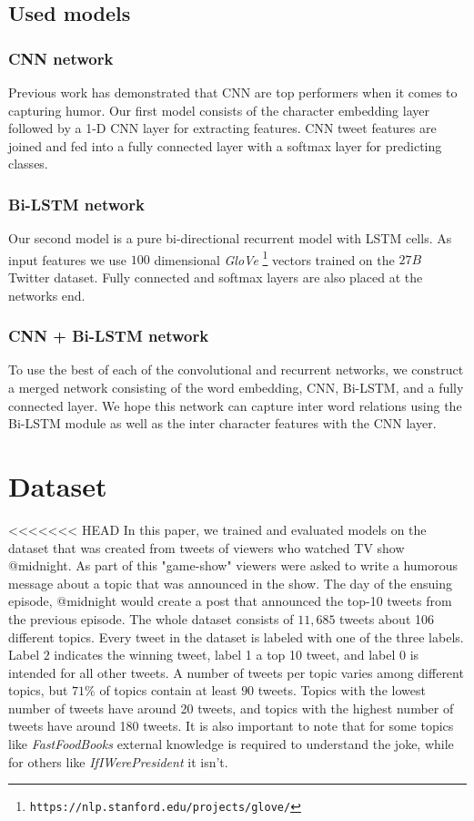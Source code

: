 \documentclass[10pt, a4paper]{article}
\begin{document}
\subsection{Used models}

\subsubsection{CNN network}
Previous work \citep{onaj_rad_s_cnn} has demonstrated that CNN are top performers
when it comes to capturing humor. Our first model consists of the character
embedding layer followed by a 1-D CNN layer for extracting features. CNN tweet
features are joined and fed into a fully connected layer with a softmax layer
for predicting classes. 

\subsubsection{Bi-LSTM network}
Our second model is a pure bi-directional recurrent model with LSTM cells. As
input features we use $100$ dimensional \emph{GloVe} \footnote{\texttt{https://nlp.stanford.edu/projects/glove/}} \citep{glove2014} vectors trained on the $27B$
Twitter dataset. Fully connected and softmax layers are also placed at the
networks end.

\subsubsection{CNN + Bi-LSTM network}
To use the best of each of the convolutional and recurrent networks, we
construct a merged network consisting of the word embedding, CNN, Bi-LSTM, and
a fully connected layer. We hope this network can capture inter word relations
using the Bi-LSTM module as well as the inter character features with the CNN
layer.

\section{Dataset}
<<<<<<< HEAD
In this paper, we trained and evaluated models on the dataset that was created
from tweets of viewers who watched TV show @midnight. As part of this "game-show"
viewers were asked to write a humorous message about a topic that was announced
in the show. The day of the ensuing episode, @midnight would create a post that
announced the top-10 tweets from the previous episode. The whole dataset consists
of $11,685$ tweets about 106 different topics. Every tweet in the dataset is
labeled with one of the three labels. Label $2$ indicates the winning tweet, label 1
a top 10 tweet, and label 0 is intended for all other
tweets. A number of tweets per topic varies among different topics, but $71\%$ of
topics contain at least $90$ tweets. Topics with the lowest number of tweets have 
around 20 tweets, and topics with the highest number of tweets have around 180 tweets.
It is also important to note that for some topics like \emph{FastFoodBooks} external
knowledge is required to understand the joke, while for others like
\emph{IfIWerePresident} it isn't.
\end{document}
